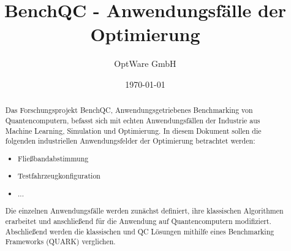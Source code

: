 \documentclass[12pt, ngerman]{article}
\begin{document}
    \chead{}
    \cfoot{}
    \rfoot{\thepage}
    \renewcommand{\headrulewidth}{0pt}

    \title{BenchQC - Anwendungsfälle der Optimierung}
    \date{\today}
    \author{OptWare GmbH}
    \maketitle
    \thispagestyle{fancy}

    \begin{abstract}
        Das Forschungsprojekt BenchQC, Anwendungsgetriebenes Benchmarking von
        Quantencomputern, befasst sich mit echten Anwendungsfällen der Industrie
        aus Machine Learning, Simulation und Optimierung.
        In diesem Dokument sollen die folgenden industriellen Anwendungsfelder der Optimierung
        betrachtet werden:
        \begin{itemize}
            \item Fließbandabstimmung
            \item Testfahrzeugkonfiguration
            \item ...
        \end{itemize}
        Die einzelnen Anwendungsfälle werden zunächst definiert,
        ihre klassischen Algorithmen erarbeitet und anschließend
        für die Anwendung auf Quantencomputern modifiziert.
        Abschließend werden die klassischen und QC Lösungen mithilfe eines
        Benchmarking Frameworks (QUARK) verglichen.
    \end{abstract}
    \newpage
\end{document}

